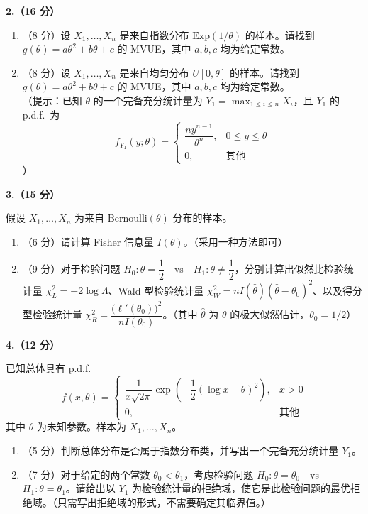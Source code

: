 \documentclass[12pt,a4paper]{ctexart}
\newcommand{\question}[2]{\bigskip\noindent\textbf{#1}\par\nobreak\medskip}
\begin{document}
\question{2.（16 分）}{16}
\begin{enumerate}[label=(\arabic*),leftmargin=2.4em]
  \item （8 分）设 $X_{1},\ldots,X_{n}$ 是来自指数分布 $\mathrm{Exp}(1/\theta)$ 的样本。请找到 $g(\theta)=a\theta^{2}+b\theta+c$ 的 MVUE，其中 $a,b,c$ 均为给定常数。
  \item （8 分）设 $X_{1},\ldots,X_{n}$ 是来自均匀分布 $U[0,\theta]$ 的样本。请找到 $g(\theta)=a\theta^{2}+b\theta+c$ 的 MVUE，其中 $a,b,c$ 均为给定常数。\\
  （提示：已知 $\theta$ 的一个完备充分统计量为 $Y_{1}=\max_{1\le i\le n}X_{i}$，且 $Y_{1}$ 的 p.d.f.\ 为
  \[ f_{Y_{1}}(y;\theta)=\begin{cases}
  \dfrac{ny^{n-1}}{\theta^{n}}, & 0\le y\le\theta\\[6pt]
  0, & \text{其他}
  \end{cases} \]）
\end{enumerate}

\question{3.（15 分）}{15}
假设 $X_{1},\ldots,X_{n}$ 为来自 $\mathrm{Bernoulli}(\theta)$ 分布的样本。
\begin{enumerate}[label=(\arabic*),leftmargin=2.4em]
  \item （6 分）请计算 Fisher 信息量 $I(\theta)$。（采用一种方法即可）
  \item （9 分）对于检验问题 $H_{0}:\theta=\dfrac{1}{2}$\ \ vs\ \ $H_{1}:\theta\neq\dfrac{1}{2}$，分别计算出似然比检验统计量 $\chi_{L}^{2}=-2\log\Lambda$、Wald-型检验统计量 $\chi_{W}^{2}=nI(\widehat{\theta})(\widehat{\theta}-\theta_{0})^{2}$、以及得分型检验统计量 $\chi_{R}^{2}=\dfrac{\bigl(\ell'(\theta_{0})\bigr)^{2}}{nI(\theta_{0})}$。（其中 $\widehat{\theta}$ 为 $\theta$ 的极大似然估计，$\theta_{0}=1/2$）
\end{enumerate}

\question{4.（12 分）}{12}
已知总体具有 p.d.f.
\[ f(x,\theta)=\begin{cases}
\dfrac{1}{x\sqrt{2\pi}}\exp\!\left(-\dfrac{1}{2}(\log x-\theta)^{2}\right), & x>0\\[6pt]
0, & \text{其他}
\end{cases} \]
其中 $\theta$ 为未知参数。样本为 $X_{1},\ldots,X_{n}$。
\begin{enumerate}[label=(\arabic*),leftmargin=2.4em]
  \item （5 分）判断总体分布是否属于指数分布类，并写出一个完备充分统计量 $Y_{1}$。
  \item （7 分）对于给定的两个常数 $\theta_{0}<\theta_{1}$，考虑检验问题 $H_{0}:\theta=\theta_{0}$\ \ vs\ \ $H_{1}:\theta=\theta_{1}$。请给出以 $Y_{1}$ 为检验统计量的拒绝域，使它是此检验问题的最优拒绝域。（只需写出拒绝域的形式，不需要确定其临界值。）
\end{enumerate}
\end{document}
